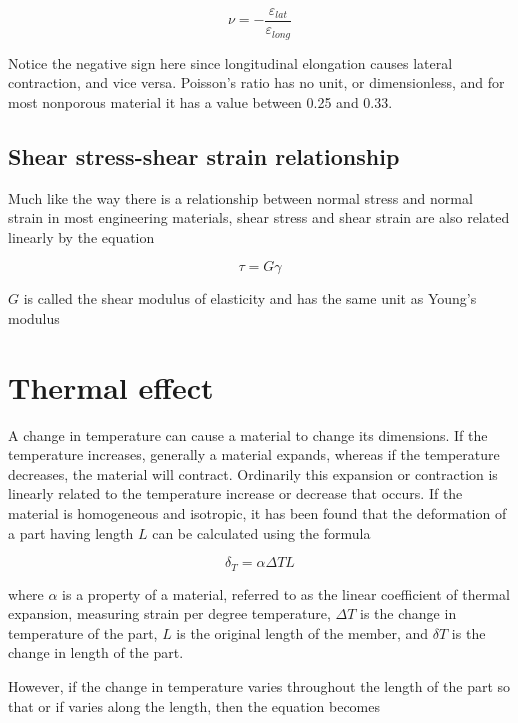 \documentclass[
10pt,
a4paper,
openany,
svgnames,
]{book}
\begin{document}
\begin{equation}
  \nu  =  - \frac{\varepsilon _{lat}}{\varepsilon _{long}}
\end{equation}
  
Notice the negative sign here since longitudinal elongation causes lateral contraction, and vice versa. Poisson’s ratio has no unit, or dimensionless, and for most nonporous material it has a value between 0.25 and 0.33.

\subsection{Shear stress-shear strain relationship}

Much like the way there is a relationship between normal stress and normal strain in most engineering materials, shear stress and shear strain are also related linearly by the equation

\begin{equation}
  \tau  = G\gamma
\end{equation}

$G$ is called the shear modulus of elasticity and has the same unit as Young’s modulus

\section{Thermal effect}

A change in temperature can cause a material to change its dimensions. If the temperature increases, generally a material expands, whereas if the temperature decreases, the material will contract. Ordinarily this expansion or contraction is linearly related to the temperature increase or decrease that occurs. If the material is homogeneous and isotropic, it has been found that the deformation of a part having length $L$ can be calculated using the formula

\begin{equation}
  \delta _T = \alpha \Delta TL
\end{equation}

where $\alpha$ is a property of a material, referred to as the linear coefficient of thermal expansion, measuring strain per degree temperature, $\Delta T$ is the change in temperature of the part, $L$ is the original length of the member, and $\delta T$ is the change in length of the part.

However, if the change in temperature varies throughout the length of the part so that or if varies along the length, then the equation becomes
\end{document}
